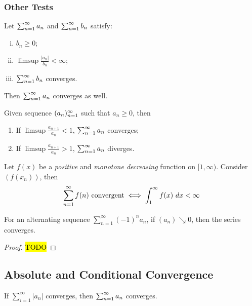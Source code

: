 \documentclass[11pt]{article}
\begin{document}
	\subsubsection{Other Tests}
	\begin{theorem}
		Let $\sum_{{n}=1}^\infty {a}_{n}$ and $\sum_{{n}=1}^\infty {b}_{n}$ satisfy:
		\begin{enumerate}[(i)]
			\item $b_n \geq 0$;
			\item $\limsup \frac{|a_n|}{b_n} < \infty$;
			\item $\sum_{{n}=1}^\infty {b}_{n}$ converges.
		\end{enumerate}
		Then $\sum_{{n}=1}^\infty {a}_{n}$ converges as well.
	\end{theorem}
	
	\begin{theorem}
		Given sequence $({a}_{n})_{{n}=1}^\infty$ such that $a_n \geq 0$, then 
		\begin{enumerate}
			\item If $\limsup \frac{a_{n+1}}{a_n} < 1$, $\sum_{{n}=1}^\infty {a}_{n}$ converges;
			\item If $\limsup \frac{a_{n+1}}{a_n} > 1$, $\sum_{{n}=1}^\infty {a}_{n}$ diverges.
		\end{enumerate}
	\end{theorem}
	
	\begin{theorem}
		Let $f(x)$ be a \emph{positive} and \emph{monotone decreasing} function on $[1, \infty)$. Consider $(f(x_n))$, then
		\begin{align}
			\sum_{n=1}^\infty f(n) \text{{ convergent}} \iff \int_1^\infty f(x)\ dx < \infty
		\end{align}
	\end{theorem}
	
	\begin{theorem}
		For an alternating sequence $\sum_{n=1}^\infty (-1)^n a_n$, if $(a_n) \searrow 0$, then the series converges.
	\end{theorem}
	
	\begin{proof}
		\hl{TODO}
	\end{proof}


	\subsection{Absolute and Conditional Convergence}
	
	\begin{corollary}
		If $\sum_{i=1}^\infty |a_n|$ converges, then $\sum_{{n}=1}^\infty {a}_{n}$ converges.
	\end{corollary}
	
\end{document}
